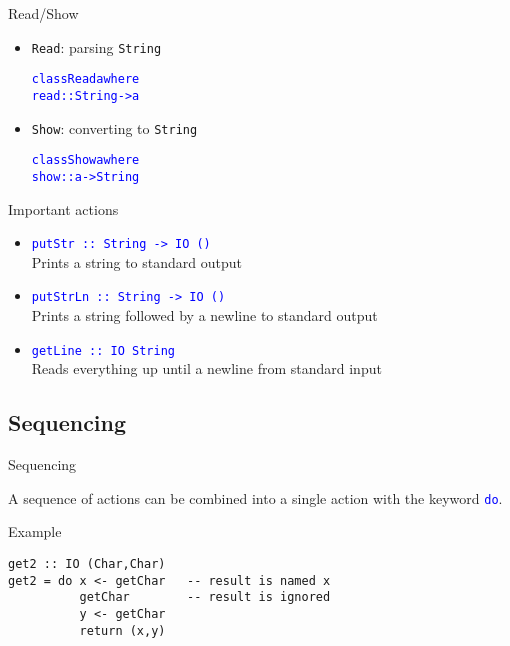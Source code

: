 \documentclass{beamer}
\def\code#1{\texttt{\frenchspacing#1}}
\begin{document}
\begin{frame}[fragile]{Read/Show}

\begin{itemize}
    \item \code{Read}: parsing \code{String}
\begin{alltt}
\textcolor{blue}{class Read a where}
  \textcolor{blue}{read :: String -> a}
\end{alltt}\pause
    \item \code{Show}: converting to \code{String}
\begin{alltt}
\textcolor{blue}{class Show a where}
  \textcolor{blue}{show :: a -> String}
\end{alltt}
\end{itemize}

\end{frame}

\begin{frame}{Important actions}

\begin{itemize}
    \item \textcolor{blue}{\code{putStr :: String -> IO ()}} \\
        Prints a string to standard output\pause
    \item \textcolor{blue}{\code{putStrLn :: String -> IO ()}} \\
        Prints a string followed by a newline to standard output\pause
    \item \textcolor{blue}{\code{getLine :: IO String}} \\
        Reads everything up until a newline from standard input
\end{itemize}

\end{frame}

\subsection{Sequencing}

\begin{frame}[fragile]{Sequencing}

A sequence of actions can be combined into a single action with the keyword \textcolor{blue}{\code{do}}.

\pause

\begin{exampleblock}{Example}
\begin{verbatim}
get2 :: IO (Char,Char)
get2 = do x <- getChar   -- result is named x
          getChar        -- result is ignored
          y <- getChar
          return (x,y)
\end{verbatim}
\end{exampleblock}

\end{frame}
\end{document}
